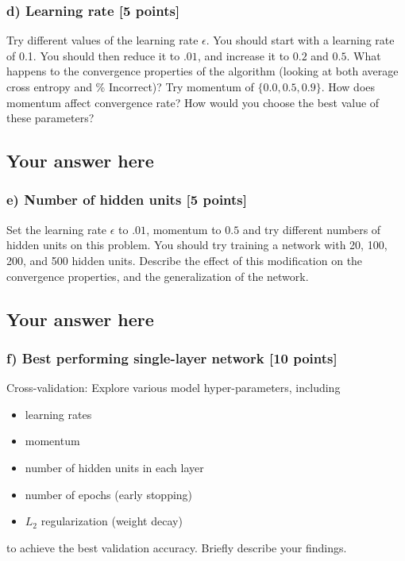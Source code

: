 \documentclass{article}
\begin{document}
\subsubsection*{d) Learning rate [5 points]}
Try different values of the learning rate $\epsilon$. 
You should start with a learning rate of 0.1. 
You should then reduce it to $.01$, and increase it to $0.2$ and
$0.5$. What happens to the convergence properties of the algorithm (looking at
both average cross entropy and \% Incorrect)? Try momentum of $\{0.0, 0.5, 0.9\}$. How does
momentum affect convergence rate? How would you choose the best value of these
parameters?

\subsection*{Your answer here}

\subsubsection*{e) Number of hidden units [5 points]}
Set the learning rate $\epsilon$ to $.01$, momentum to $0.5$ and try different numbers of
hidden units on this problem.
You should try training a network with 20, 100, 200, and 500  hidden units.
Describe the effect of this modification on the convergence properties, and the
generalization of the network.

\subsection*{Your answer here}

\subsubsection*{f) Best performing single-layer network [10 points]}
Cross-validation: 
Explore various model hyper-parameters, including 
\begin{itemize}
\item learning rates
\vspace{-0.09in}
\item momentum
\vspace{-0.09in}
\item number of hidden units in each layer
\vspace{-0.09in}
\item number of epochs (early stopping)
\vspace{-0.09in}
\item $L_2$ regularization (weight decay)
\end{itemize}
to achieve the best validation accuracy. Briefly describe your findings.
\\
\end{document}
